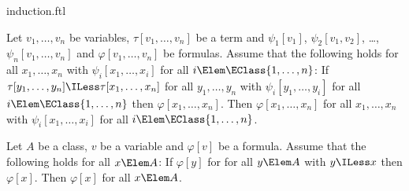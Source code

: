 \documentclass{stex}
\begin{document}
\begin{smodule}{induction.ftl}


\begin{fakeforthel}
  \begin{axiom*}
    Let $v_1,\dots,v_n$ be variables, $\tau[v_1,\dots,v_n]$ be a term and
    $\psi_1[v_1]$, $\psi_2[v_1,v_2]$, \dots, $\psi_n[v_1,\dots,v_n]$ and $\varphi[v_1,\dots,v_n]$ be formulas.
    Assume that the following holds for all $x_1,\dots,x_n$ with $\psi_i[x_1,\dots,x_i]$ for all $i \Elem \EClass{1,\dots,n}$:
    If $\tau[y_1,\dots,y_n] \ILess \tau[x_1,\dots,x_n]$
    for all $y_1,\dots,y_n$ with $\psi_i[y_1,\dots,y_i]$ for all $i \Elem \EClass{1,\dots,n}$
    then $\varphi[x_1,\dots,x_n]$.
    Then $\varphi[x_1,\dots,x_n]$ for all $x_1,\dots,x_n$ with $\psi_i[x_1,\dots,x_i]$ for all $i \Elem \EClass{1,\dots,n}$.
  \end{axiom*}
\end{fakeforthel}

\begin{fakeforthel}
  \begin{proposition*}
    Let $A$ be a class, $v$ be a variable and $\varphi[v]$ be a formula.
    Assume that the following holds for all $x \Elem A$:
    If $\varphi[y]$ for for all $y \Elem A$ with $y \ILess x$ then $\varphi[x]$.
    Then $\varphi[x]$ for all $x \Elem A$.
  \end{proposition*}
\end{fakeforthel}

\end{smodule}
\end{document}
